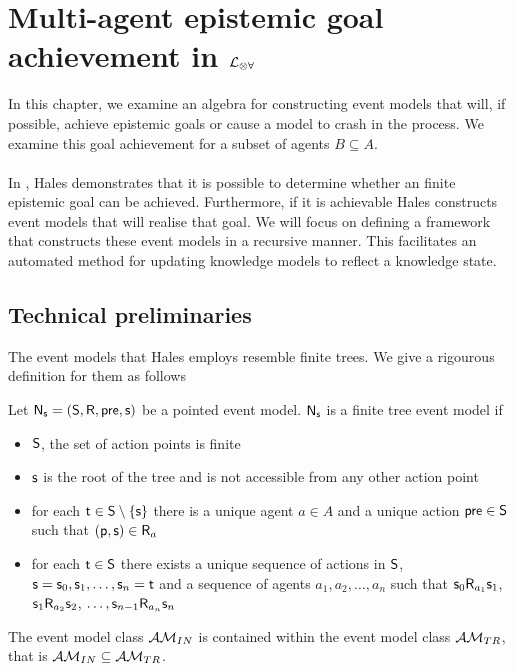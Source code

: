 \section{Multi-agent epistemic goal achievement in $\mathcal{L}_{\otimes\forall}$}

In this chapter, we examine an algebra for constructing event models that will, if possible, achieve
epistemic goals or cause a model to crash in the process.
We examine this goal achievement for a subset of agents $B \subseteq A$.\\
\\
In \cite{hales13synthesis}, Hales demonstrates that it is possible to determine whether an
finite epistemic goal can be achieved.
Furthermore, if it is achievable Hales constructs event models that will realise
that goal.
We will focus on defining a framework that constructs these event models in a
recursive manner.
This facilitates an automated method for updating knowledge models to reflect a
knowledge state.

\subsection{Technical preliminaries}

The event models that Hales employs resemble finite trees.
We give a rigourous definition for them as follows

\begin{defn} \label{finTree}
Let $\mathrm{\mathsf{N}}_\mathrm{\mathsf{s}} = (\mathrm{\mathsf{S}}, \mathrm{\mathsf{R}}, \mathrm{\mathsf{pre}}, \mathrm{\mathsf{s}})$ be a pointed event model.
$\mathrm{\mathsf{N}}_\mathrm{\mathsf{s}}$ is a finite tree event model if
\begin{itemize}
	\item $\mathrm{\mathsf{S}}$, the set of action points is finite
	\item $\mathrm{\mathsf{s}}$ is the root of the tree and is not accessible from any other action point
	\item for each $\mathrm{\mathsf{t}} \in \mathrm{\mathsf{S}} \setminus \{ \mathrm{\mathsf{s}} \}$ there is a unique agent $a \in A$ and a unique
	action $\mathrm{\mathsf{pre}} \in \mathrm{\mathsf{S}}$ such that $\mathrm{\mathsf{(p,s)}} \in \mathrm{\mathsf{R}}_a$
	\item for each $\mathrm{\mathsf{t}} \in \mathrm{\mathsf{S}}$ there exists a unique sequence of actions in $\mathrm{\mathsf{S}}$, $\mathrm{\mathsf{s}} = \mathrm{\mathsf{s}}_0,
	\mathrm{\mathsf{s}}_1, \ldots, \mathrm{\mathsf{s}}_n = \mathrm{\mathsf{t}}$ and a sequence of agents $a_1, a_2, \ldots, a_n$ such that $\mathrm{\mathsf{s}}_0
	\mathrm{\mathsf{R}}_{a_1}
	\mathrm{\mathsf{s}}_1$, $\mathrm{\mathsf{s}}_1 \mathrm{\mathsf{R}}_{a_2} \mathrm{\mathsf{s}}_2$, $\ldots, \mathrm{\mathsf{s}}_{n-1} \mathrm{\mathsf{R}}_{a_n} \mathrm{\mathsf{s}}_n$
\end{itemize}
\end{defn}

\begin{lemma} \label{insaneIsTree}
The event model class $\mathcal{AM}_{IN}$ is contained within the event model class
$\mathcal{AM}_{TR}$, that is $\mathcal{AM}_{IN} \subseteq \mathcal{AM}_{TR}$.
\end{lemma}

